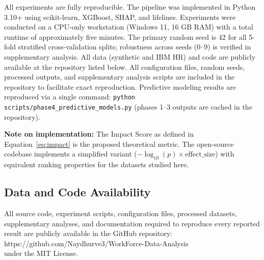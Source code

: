 \documentclass[conference]{IEEEtran}
\begin{document}
All experiments are fully reproducible. The pipeline was implemented in Python 3.10+ using scikit-learn, XGBoost, SHAP, and lifelines. Experiments were conducted on a CPU-only workstation (Windows 11, 16 GB RAM) with a total runtime of approximately five minutes. The primary random seed is 42 for all 5-fold stratified cross-validation splits; robustness across seeds (0--9) is verified in supplementary analysis. All data (synthetic and IBM HR) and code are publicly available at the repository listed below. All configuration files, random seeds, processed outputs, and supplementary analysis scripts are included in the repository to facilitate exact reproduction. Predictive modeling results are reproduced via a single command: \texttt{python scripts/phase4\_predictive\_models.py} (phases 1--3 outputs are cached in the repository).

\textbf{Note on implementation:} The Impact Score as defined in Equation~\ref{eq:impact} is the proposed theoretical metric. The open-source codebase implements a simplified variant ($-\log_{10}(p) \times \text{effect\_size}$) with equivalent ranking properties for the datasets studied here.

\subsection*{Data and Code Availability}

All source code, experiment scripts, configuration files, processed datasets, supplementary analyses, and documentation required to reproduce every reported result are publicly available in the GitHub repository:\\
\small https://github.com/Naydhurve3/WorkForce-Data-Analysis\\
under the MIT License.



\end{document}
